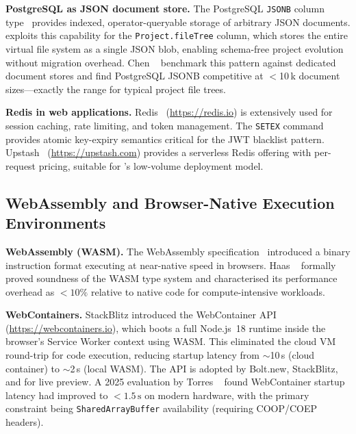 \textbf{PostgreSQL as JSON document store.}
The PostgreSQL \texttt{JSONB} column type~\cite{postgresql2024} provides
indexed, operator-queryable storage of arbitrary JSON documents. \echoray{}
exploits this capability for the \texttt{Project.fileTree} column, which stores
the entire virtual file system as a single JSON blob, enabling schema-free
project evolution without migration overhead. Chen \etal~\cite{chen2025cloudide}
benchmark this pattern against dedicated document stores and find PostgreSQL
JSONB competitive at $<$10\,k document sizes---exactly the range for typical
project file trees.

\textbf{Redis in web applications.}
Redis~\cite{redis2024} (\url{https://redis.io}) is extensively used for
session caching, rate limiting, and token management. The \texttt{SETEX}
command provides atomic key-expiry semantics critical for the JWT blacklist
pattern. Upstash~\cite{upstash2024} (\url{https://upstash.com}) provides a
serverless Redis offering with per-request pricing, suitable for \echoray{}'s
low-volume deployment model.

\subsection{WebAssembly and Browser-Native Execution Environments}
\label{sub:wasm_lit}

\textbf{WebAssembly (WASM).}
The WebAssembly specification~\cite{wasm2019} introduced a binary instruction
format executing at near-native speed in browsers. Haas \etal~\cite{haas2017bringing}
formally proved soundness of the WASM type system and characterised its
performance overhead as $<\!10\%$ relative to native code for compute-intensive
workloads.

\textbf{WebContainers.}
StackBlitz introduced the WebContainer API~\cite{webcontainer2023}
(\url{https://webcontainers.io}), which boots a full Node.js~18 runtime inside
the browser's Service Worker context using WASM. This eliminated the cloud VM
round-trip for code execution, reducing startup latency from $\sim$10\,s (cloud
container) to $\sim$2\,s (local WASM). The API is adopted by Bolt.new,
StackBlitz, and \echoray{} for live preview. A 2025 evaluation by Torres
\etal~\cite{torres2025wasm} found WebContainer startup latency had improved to
$<\!1.5\,\text{s}$ on modern hardware, with the primary constraint being
\texttt{SharedArrayBuffer} availability (requiring COOP/COEP headers).


